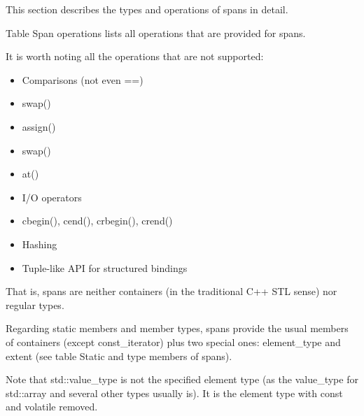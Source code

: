
This section describes the types and operations of spans in detail.


Table Span operations lists all operations that are provided for spans.

It is worth noting all the operations that are not supported:

\begin{itemize}
\item
Comparisons (not even ==)

\item
swap()

\item
assign()

\item
swap()

\item
at()

\item
I/O operators

\item
cbegin(), cend(), crbegin(), crend()

\item
Hashing

\item
Tuple-like API for structured bindings
\end{itemize}

That is, spans are neither containers (in the traditional C++ STL sense) nor regular types.

Regarding static members and member types, spans provide the usual members of containers (except const\_iterator) plus two special ones: element\_type and extent (see table Static and type members of spans).

Note that std::value\_type is not the specified element type (as the value\_type for std::array and several other types usually is). It is the element type with const and volatile removed.

